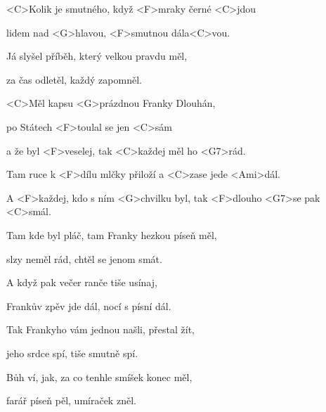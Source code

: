 

\zs
<C>Kolik je smutného,
když <F>mraky černé <C>jdou

lidem nad <G>hlavou, <F>smutnou dála<C>vou.

Já slyšel příběh, který velkou pravdu měl,

za čas odletěl, každý zapomněl.
\ks

\zr
<C>Měl kapsu <G>prázdnou Franky Dlouhán,

po Státech <F>toulal se jen <C>sám

a že byl <F>veselej, tak <C>každej měl ho <G7>rád.

Tam ruce k <F>dílu mlčky přiloží
a <C>zase
jede <Ami>dál.

A <F>každej, kdo s ním
<G>chvilku byl, tak <F>dlouho <G7>se pak <C>smál.
\kr

\zs
Tam kde byl pláč, tam Franky hezkou píseň měl,

slzy neměl rád, chtěl se jenom smát.

A když pak večer ranče tiše usínaj,

Frankův zpěv jde dál, nocí s písní dál.
\ks

\zr \kr

\zs
Tak Frankyho vám jednou našli, přestal žít,

jeho srdce spí, tiše smutně spí.

Bůh ví, jak, za co tenhle smíšek konec měl,

farář píseň pěl, umíraček zněl.
\ks
\kp
